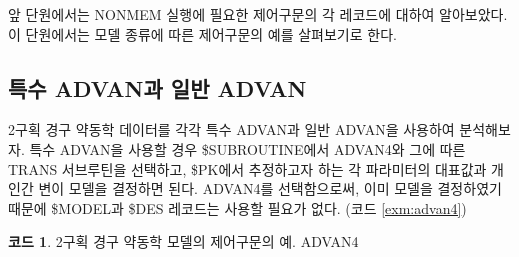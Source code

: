 \documentclass[
  11pt,
  krantz2, a4paper, twoside]{krantz}
\theoremstyle{definition}
\theoremstyle{definition}
\newtheorem{example}{코드}[chapter]
\theoremstyle{definition}
\theoremstyle{remark}
\begin{document}
앞 단원에서는 NONMEM 실행에 필요한 제어구문의 각 레코드에 대하여 알아보았다. 이 단원에서는 모델 종류에 따른 제어구문의 예를 살펴보기로 한다.

\hypertarget{uxd2b9uxc218-advanuxacfc-uxc77cuxbc18-advan}{%
\subsection{특수 ADVAN과 일반 ADVAN}\label{uxd2b9uxc218-advanuxacfc-uxc77cuxbc18-advan}}


2구획 경구 약동학 데이터를 각각 특수 ADVAN과 일반 ADVAN을 사용하여 분석해보자. 특수 ADVAN을 사용할 경우 \$SUBROUTINE에서 ADVAN4와 그에 따른 TRANS 서브루틴을 선택하고, \$PK에서 추정하고자 하는 각 파라미터의 대표값과 개인간 변이 모델을 결정하면 된다. ADVAN4를 선택함으로써, 이미 모델을 결정하였기 때문에 \$MODEL과 \$DES 레코드는 사용할 필요가 없다. (코드 \ref{exm:advan4})

\begin{example}
\protect\hypertarget{exm:advan4}{}{\label{exm:advan4} }2구획 경구 약동학 모델의 제어구문의 예. ADVAN4
\end{example}
\vspace{-5ex}
\end{document}
